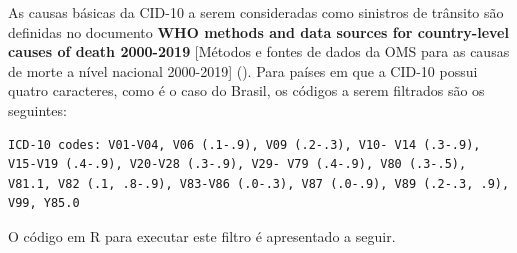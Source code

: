 \documentclass[
]{article}
\begin{document}
As causas básicas da CID-10 a serem consideradas como sinistros de
trânsito são definidas no documento \textbf{WHO methods and data sources
for country-level causes of death 2000-2019} {[}Métodos e fontes de
dados da OMS para as causas de morte a nível nacional 2000-2019{]}
(). Para países em que a CID-10 possui
quatro caracteres, como é o caso do Brasil, os códigos a serem filtrados
são os seguintes:

\begin{verbatim}
ICD-10 codes: V01-V04, V06 (.1-.9), V09 (.2-.3), V10- V14 (.3-.9), V15-V19 (.4-.9), V20-V28 (.3-.9), V29- V79 (.4-.9), V80 (.3-.5), V81.1, V82 (.1, .8-.9), V83-V86 (.0-.3), V87 (.0-.9), V89 (.2-.3, .9), V99, Y85.0
\end{verbatim}

O código em R para executar este filtro é apresentado a seguir.
\end{document}
